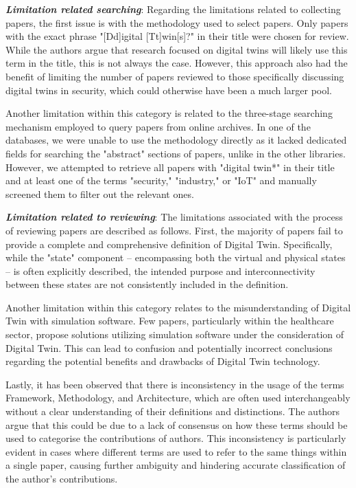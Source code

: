 \textbf{\textit{Limitation related searching}}: Regarding the limitations related to collecting papers, the first issue is with the methodology used to select papers. Only papers with the exact phrase "[Dd]igital [Tt]win[s]?" in their title were chosen for review. While the authors argue that research focused on digital twins will likely use this term in the title, this is not always the case. However, this approach also had the benefit of limiting the number of papers reviewed to those specifically discussing digital twins in security, which could otherwise have been a much larger pool. 

Another limitation within this category is related to the three-stage searching mechanism employed to query papers from online archives. In one of the databases, we were unable to use the methodology directly as it lacked dedicated fields for searching the "abstract" sections of papers, unlike in the other libraries. However, we attempted to retrieve all papers with "digital twin*" in their title and at least one of the terms "security," "industry," or "IoT" and manually screened them to filter out the relevant ones.

\textbf{\textit{Limitation related to reviewing}}: The limitations associated with the process of reviewing papers are described as follows. First, the majority of papers fail to provide a complete and comprehensive definition of Digital Twin. Specifically, while the "state" component -- encompassing both the virtual and physical states -- is often explicitly described, the intended purpose and interconnectivity between these states are not consistently included in the definition.

Another limitation within this category relates to the misunderstanding of Digital Twin with simulation software. Few papers, particularly within the healthcare sector, propose solutions utilizing simulation software under the consideration of Digital Twin. This can lead to confusion and potentially incorrect conclusions regarding the potential benefits and drawbacks of Digital Twin technology.

 Lastly, it has been observed that there is inconsistency in the usage of the terms Framework, Methodology, and Architecture, which are often used interchangeably without a clear understanding of their definitions and distinctions. The authors argue that this could be due to a lack of consensus on how these terms should be used to categorise the contributions of authors. This inconsistency is particularly evident in cases where different terms are used to refer to the same things within a single paper, causing further ambiguity and hindering accurate classification of the author's contributions.

